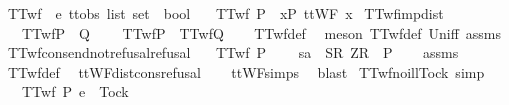 \begin{isabellebody}
\isanewline
{}\isamarkupfalse%
\ TTwf\ {\isacharcolon}{\isacharcolon}\ {\isachardoublequoteopen}{\isacharprime}e\ ttobs\ list\ set\ {\isasymRightarrow}\ bool{\isachardoublequoteclose}\ \isanewline
\ \ {\isachardoublequoteopen}TTwf\ P\ {\isacharequal}\ {\isacharparenleft}{\isasymforall}x{\isasymin}P{\isachardot}\ ttWF\ x{\isacharparenright}{\isachardoublequoteclose}\isanewline
\isanewline
{}\isamarkupfalse%
\ TTwf{\isacharunderscore}imp{\isacharunderscore}dist{\isacharcolon}\isanewline
\ \ \ {\isachardoublequoteopen}TTwf{\isacharparenleft}P\ {\isasymunion}\ Q{\isacharparenright}{\isachardoublequoteclose}\ \isanewline
\ \ \ {\isachardoublequoteopen}TTwf{\isacharparenleft}P{\isacharparenright}\ {\isasymand}\ TTwf{\isacharparenleft}Q{\isacharparenright}{\isachardoublequoteclose}\isanewline
%
\isadelimproof
\ \ %
\endisadelimproof
%
\isatagproof
{}\isamarkupfalse%
\ TTwf{\isacharunderscore}def\ \isamarkupfalse%
\ {\isacharparenleft}meson\ TTwf{\isacharunderscore}def\ Un{\isacharunderscore}iff\ assms{\isacharparenright}%
\endisatagproof
{\isafoldproof}%
%
\isadelimproof
\isanewline
%
\endisadelimproof
\isanewline
{}\isamarkupfalse%
\ TTwf{\isacharunderscore}cons{\isacharunderscore}end{\isacharunderscore}not{\isacharunderscore}refusal{\isacharunderscore}refusal{\isacharcolon}\isanewline
\ \ \ {\isachardoublequoteopen}TTwf\ P{\isachardoublequoteclose}\isanewline
\ \ \ {\isachardoublequoteopen}{\isasymnot}\ sa\ {\isacharat}\ {\isacharbrackleft}{\isacharbrackleft}S{\isacharbrackright}\isactrlsub R{\isacharcomma}\ {\isacharbrackleft}Z{\isacharbrackright}\isactrlsub R{\isacharbrackright}\ {\isasymin}\ P{\isachardoublequoteclose}\isanewline
%
\isadelimproof
\ \ %
\endisadelimproof
%
\isatagproof
{}\isamarkupfalse%
\ assms\ \isamarkupfalse%
\ TTwf{\isacharunderscore}def\ \isamarkupfalse%
\ ttWF{\isacharunderscore}dist{\isacharunderscore}cons{\isacharunderscore}refusal\isanewline
\ \ \isamarkupfalse%
\ ttWF{\isachardot}simps{\isacharparenleft}{}{}{\isacharparenright}\ \isamarkupfalse%
\ blast%
\endisatagproof
{\isafoldproof}%
%
\isadelimproof
\isanewline
%
\endisadelimproof
\isanewline
{}\isamarkupfalse%
\ TTwf{\isacharunderscore}no{\isacharunderscore}ill{\isacharunderscore}Tock\ {\isacharbrackleft}simp{\isacharbrackright}{\isacharcolon}\isanewline
\ \ \ {\isachardoublequoteopen}TTwf\ P{\isachardoublequoteclose}\ {\isachardoublequoteopen}e\ {\isasymnoteq}\ Tock{\isachardoublequoteclose}\isanewline

\end{isabellebody}
